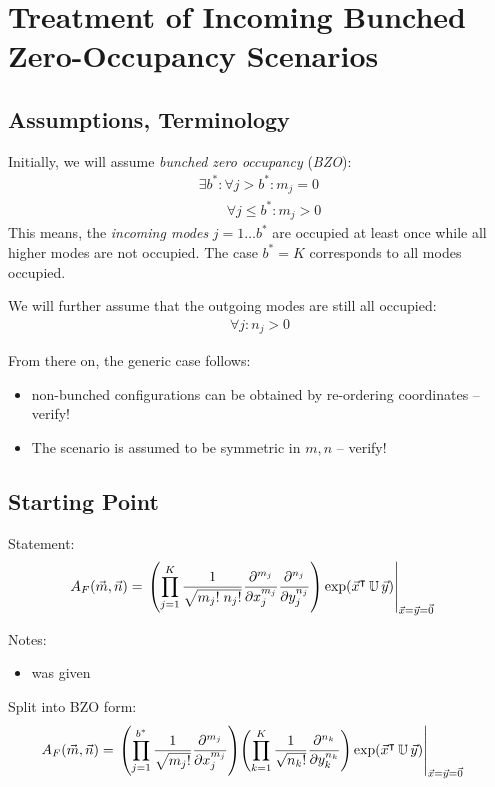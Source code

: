 \documentclass[
	english,
	a4paper,
	fontsize=10pt,
	parskip=half,
	titlepage=true,
	DIV=12,
	final
]{scrreprt}
\title{\myTitle}
\author{\myName}
\date{\today}
\newcommand*{\transp}{\ensuremath{^\intercal}}
\begin{document}
\tableofcontents
\newpage

\chapter{Treatment of Incoming Bunched Zero-Occupancy Scenarios}
\section{Assumptions, Terminology}
Initially, we will assume \emph{bunched zero occupancy} (\emph{BZO}):
\begin{align}
	\exists b^{*} : \forall j > b^{*} : m_j = 0 \\
	\qquad \forall j \leq b^* : m_j > 0
\end{align}
This means, the \emph{incoming modes} $j = 1 \ldots b^{*}$ are occupied at least once while all higher modes are not occupied. The case $b^* = K$ corresponds to all modes occupied.

We will further assume that the outgoing modes are still all occupied:
\begin{align}
	\forall j : n_j > 0
\end{align}

From there on, the generic case follows:
\begin{itemize}
\item non-bunched configurations can be obtained by re-ordering coordinates -- verify!
\item The scenario is assumed to be symmetric in $m, n$ -- verify!
\end{itemize}


\section{Starting Point}
Statement:
\begin{align}
	A_F(\vec{m}, \vec{n})
&=
	\eval{\qty(
			\prod_{j=1}^{K}
			\frac
				{1}
				{\sqrt{m_j! \; n_j!}}
			\pdv[m_j]{x_j}
			\pdv[n_j]{y_j}
		) \exp(\vec{x}\transp \, \mathbb{U} \, \vec{y})
	}_{\vec{x} = \vec{y} = \vec{0}}
\label{eqn:BSA_raw}
\end{align}

Notes:
\begin{itemize}
\item was given
\end{itemize}

Split into BZO form:
\begin{align}
	A_F(\vec{m}, \vec{n})
&=
	\eval{
		\qty(
			\prod_{j=1}^{b^*}
			\frac {1} {\sqrt{m_j!}}
			\pdv[m_j]{x_j}
		)
		\qty(
			\prod_{k=1}^{K}
			\frac
				{1}
				{\sqrt{n_k!}}
			\pdv[n_k]{y_k}
		)
		\exp(\vec{x}\transp \, \mathbb{U} \, \vec{y})
	}_{\vec{x} = \vec{y} = \vec{0}}
\label{eqn:BSA_raw_BZO}
\end{align}
\end{document}

